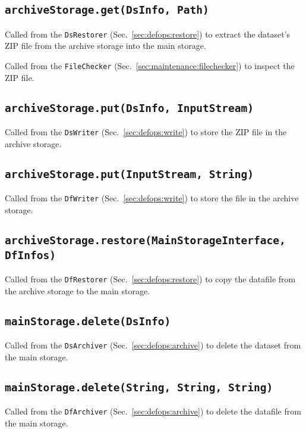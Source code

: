 \documentclass[paper=a4]{scrartcl}
\begin{document}
\subsection{\texttt{archiveStorage.get(DsInfo, Path)}}

Called from the \texttt{DsRestorer} (Sec.~\ref{sec:defops:restore})
to extract the dataset's ZIP file from the archive storage into the
main storage.

Called from the \texttt{FileChecker}
(Sec.~\ref{sec:maintenance:filechecker}) to inspect the ZIP file.

\subsection{\texttt{archiveStorage.put(DsInfo, InputStream)}}

Called from the \texttt{DsWriter} (Sec.~\ref{sec:defops:write}) to
store the ZIP file in the archive storage.

\subsection{\texttt{archiveStorage.put(InputStream, String)}}

Called from the \texttt{DfWriter} (Sec.~\ref{sec:defops:write}) to
store the file in the archive storage.

\subsection{\texttt{archiveStorage.restore(MainStorageInterface, DfInfos)}}

Called from the \texttt{DfRestorer} (Sec.~\ref{sec:defops:restore})
to copy the datafile from the archive storage to the main storage.

\subsection{\texttt{mainStorage.delete(DsInfo)}}

Called from the \texttt{DsArchiver} (Sec.~\ref{sec:defops:archive})
to delete the dataset from the main storage.

\subsection{\texttt{mainStorage.delete(String, String, String)}}

Called from the \texttt{DfArchiver} (Sec.~\ref{sec:defops:archive})
to delete the datafile from the main storage.
\end{document}
